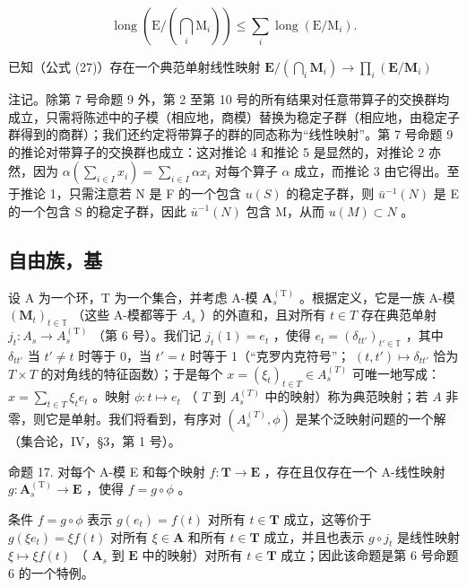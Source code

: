 \[
\operatorname{long} \left(\mathrm{E} / \left(\bigcap_ {i} \mathrm{M} _ {i}\right)\right) \leqslant \sum_ {i} \operatorname{long} (\mathrm{E} / \mathrm{M} _ {i}).\tag{42}
\]

已知（公式 (27)）存在一个典范单射线性映射 \(\mathbf{E} / \left(\bigcap_{i}\mathbf{M}_{i}\right)\to \prod_{i}(\mathbf{E} / \mathbf{M}_{i})\)

注记。除第 7 号命题 9 外，第 2 至第 10 号的所有结果对任意带算子的交换群均成立，只需将陈述中的子模（相应地，商模）替换为稳定子群（相应地，由稳定子群得到的商群）；我们还约定将带算子的群的同态称为“线性映射”。第 7 号命题 9 的推论对带算子的交换群也成立：这对推论 4 和推论 5 是显然的，对推论 2 亦然，因为 \(\alpha\left(\sum_{i\in I}x_i\right)=\sum_{i\in I}\alpha x_i\) 对每个算子 \(\alpha\) 成立，而推论 3 由它得出。至于推论 1，只需注意若 N 是 F 的一个包含 \(u(S)\) 的稳定子群，则 \(\bar{u}^{-1}(N)\) 是 E 的一个包含 S 的稳定子群，因此 \(\bar{u}^{-1}(N)\) 包含 M，从而 \(u(M)\subset N\) 。

\subsection{自由族，基}

设 A 为一个环，T 为一个集合，并考虑 A-模 \(\mathbf{A}_{s}^{\mathrm{(T)}}\) 。根据定义，它是一族 A-模 \((\mathbf{M}_{t})_{t\in\mathbb{T}}\) （这些 A-模都等于 \(A_{s}\) ）的外直和，且对所有 \(t\in T\) 存在典范单射 \(j_{t}:A_{s}\to A_{s}^{\mathrm{(T)}}\) （第 6 号）。我们记 \(j_{t}(1) = e_{t}\) ，使得 \(e_{t} = (\delta_{tt'})_{t' \in \mathbb{T}}\) ，其中 \(\delta_{tt'}\) 当 \(t' \neq t\) 时等于 0，当 \(t' = t\) 时等于 1（“克罗内克符号”； \((t, t') \mapsto \delta_{tt'}\) 恰为 \(T \times T\) 的对角线的特征函数）；于是每个 \(x = (\xi_{t})_{t \in T} \in A_{s}^{(T)}\) 可唯一地写成： \(x = \sum_{t \in T} \xi_{t} e_{t}\) 。映射 \(\phi: t \mapsto e_{t}\) （ \(T\) 到 \(A_{s}^{(T)}\) 中的映射）称为典范映射；若 \(A\) 非零，则它是单射。我们将看到，有序对 \((A_{s}^{(T)}, \phi)\) 是某个泛映射问题的一个解（集合论，IV，§3，第 1 号）。

命题 17. 对每个 A-模 E 和每个映射 \(f: \mathbf{T} \to \mathbf{E}\) ，存在且仅存在一个 A-线性映射 \(g: \mathbf{A}_{s}^{(\mathrm{T})} \to \mathbf{E}\) ，使得 \(f = g \circ \phi\) 。

条件 \(f = g \circ \phi\) 表示 \(g(e_t) = f(t)\) 对所有 \(t \in \mathbf{T}\) 成立，这等价于 \(g(\xi e_t) = \xi f(t)\) 对所有 \(\xi \in \mathbf{A}\) 和所有 \(t \in \mathbf{T}\) 成立，并且也表示 \(g \circ j_t\) 是线性映射 \(\xi \mapsto \xi f(t)\) （ \(\mathbf{A}_s\) 到 \(\mathbf{E}\) 中的映射）对所有 \(t \in \mathbf{T}\) 成立；因此该命题是第 6 号命题 6 的一个特例。

